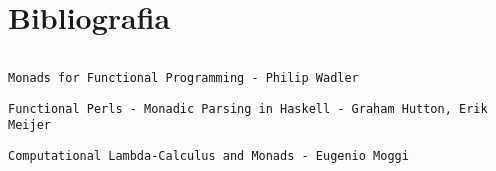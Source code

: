 \documentclass[twocolumn,10pt]{article}
\begin{document}
\section{Bibliografia}


\textit{}

\lstset{language=Haskell}
\begin{lstlisting}

\end{lstlisting}


 \texttt{Monads for Functional Programming - Philip Wadler}

 \texttt{Functional Perls - Monadic Parsing in Haskell - Graham Hutton, Erik Meijer}

 \texttt{Computational Lambda-Calculus and Monads - Eugenio Moggi}
\end{document}
